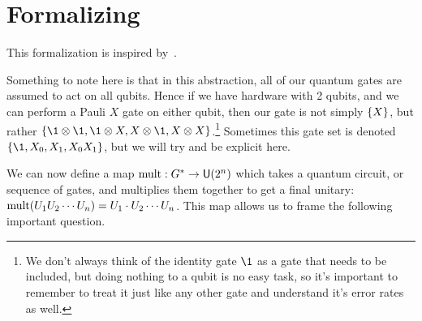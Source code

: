 \section{Formalizing}

This formalization is inspired by~\cite{formalcircuit}.

Something to note here is that in this abstraction, all of our quantum gates are assumed to act on all qubits.
Hence if we have hardware with 2 qubits, and we can perform a Pauli $X$ gate on either qubit, then our gate is not simply $\qty{X}$, but rather $\qty{\1\otimes \1, \1\otimes X, X\otimes \1, X\otimes X}$.\footnote{We don't always think of the identity gate $\1$ as a gate that needs to be included, but doing nothing to a qubit is no easy task, so it's important to remember to treat it just like any other gate and understand it's error rates as well.}
Sometimes this gate set is denoted $\qty{\1, X_0, X_1, X_0X_1}$, but we will try and be explicit here.

We can now define a map $\operatorname{mult}: G^* \to \mathsf{U} (2^n)$ which takes a quantum circuit, or sequence of gates, and multiplies them together to get a final unitary: $\operatorname{mult}(U_1U_2\cdots U_n) = U_1\cdot U_2\cdots U_n$.
This map allows us to frame the following important question.

